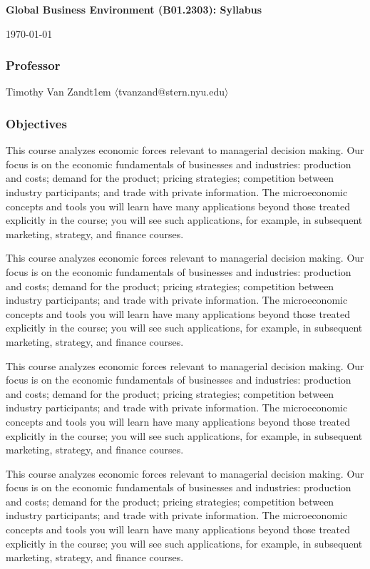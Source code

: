 \documentclass[12pt]{article}
\begin{document}
\thispagestyle{empty} 
\Head 
\centerline{\large\bf Global Business Environment (B01.2303): Syllabus}
\centerline{\today}


\subsubsection*{Professor}
Timothy Van Zandt\kern 1em $\langle$tvanzand@stern.nyu.edu$\rangle$

\subsubsection*{Objectives}

This course analyzes economic forces relevant to managerial decision making. Our focus is on the economic fundamentals of businesses and industries: production and costs; demand for the product; pricing strategies; competition between industry participants; and trade with private information. The microeconomic concepts and tools you will learn have many applications beyond those treated explicitly in the  course; you will see such applications, for example, in subsequent marketing, strategy, and finance courses.

This course analyzes economic forces relevant to managerial decision making. Our focus is on the economic fundamentals of businesses and industries: production and costs; demand for the product; pricing strategies; competition between industry participants; and trade with private information. The microeconomic concepts and tools you will learn have many applications beyond those treated explicitly in the  course; you will see such applications, for example, in subsequent marketing, strategy, and finance courses.

This course analyzes economic forces relevant to managerial decision making. Our focus is on the economic fundamentals of businesses and industries: production and costs; demand for the product; pricing strategies; competition between industry participants; and trade with private information. The microeconomic concepts and tools you will learn have many applications beyond those treated explicitly in the  course; you will see such applications, for example, in subsequent marketing, strategy, and finance courses.

This course analyzes economic forces relevant to managerial decision making. Our focus is on the economic fundamentals of businesses and industries: production and costs; demand for the product; pricing strategies; competition between industry participants; and trade with private information. The microeconomic concepts and tools you will learn have many applications beyond those treated explicitly in the  course; you will see such applications, for example, in subsequent marketing, strategy, and finance courses.
\end{document}
